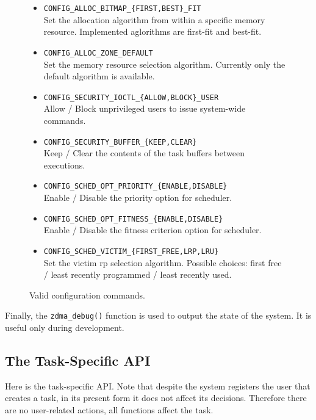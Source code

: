 \begin{figure}[htb!]
\begin{itemize}
\item	\texttt{CONFIG\_ALLOC\_BITMAP\_\{FIRST,BEST\}\_FIT}\\
	Set the allocation algorithm from within a specific memory resource.
	Implemented aglorithms are first-fit and best-fit.

\item	\texttt{CONFIG\_ALLOC\_ZONE\_DEFAULT}\\
	Set the memory resource selection algorithm.
	Currently only the default algorithm is available.

\item	\texttt{CONFIG\_SECURITY\_IOCTL\_\{ALLOW,BLOCK\}\_USER}\\
	Allow / Block unprivileged users to issue system-wide commands.

\item	\texttt{CONFIG\_SECURITY\_BUFFER\_\{KEEP,CLEAR\}}\\
	Keep / Clear the contents of the task buffers between executions.

\item	\texttt{CONFIG\_SCHED\_OPT\_PRIORITY\_\{ENABLE,DISABLE\}}\\
	Enable / Disable the priority option for scheduler.

\item	\texttt{CONFIG\_SCHED\_OPT\_FITNESS\_\{ENABLE,DISABLE\}}\\
	Enable / Disable the fitness criterion option for scheduler.

\item	\texttt{CONFIG\_SCHED\_VICTIM\_\{FIRST\_FREE,LRP,LRU\}}\\
	Set the victim \gls{rp} selection algorithm.
	Possible choices: first free / least recently programmed / least recently used.
\end{itemize}
\caption{Valid configuration commands.}
\label{fig:config}
\end{figure}

Finally, the \texttt{zdma\_debug()} function is used to output the state of the system.
It is useful only during development.

\subsection{The Task-Specific API}

Here is the task-specific API. Note that despite the system registers the user
that creates a task, in its present form it does not affect its decisions.
Therefore there are no user-related actions, all functions affect the task.

